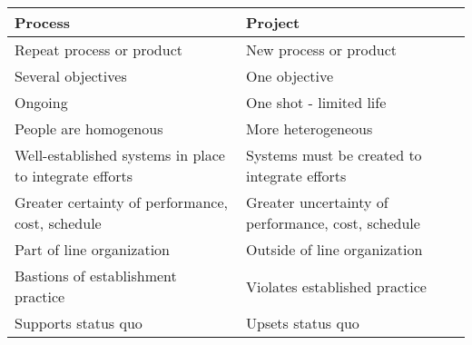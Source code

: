 \begin{itemize}
		\begin{table}[H]
			\centering
			\begin{tabular}{| l | l |}
				\hline
				Process & Project \\ \hline
				Repeat process or product & New process or product \\ \hline
				Several objectives & One objective \\ \hline
				Ongoing & One shot - limited life \\ \hline
				People are homogenous & More heterogeneous \\ \hline
				Well-established systems in place to integrate efforts & Systems must be
				created to integrate efforts \\ \hline
				Greater certainty of performance, cost, schedule & Greater uncertainty
				of performance, cost, schedule \\ \hline
				Part of line organization & Outside of line organization \\ \hline
				Bastions of establishment practice & Violates established practice \\ \hline
				Supports status quo & Upsets status quo \\ \hline
			\end{tabular}
		\end{table}
	\end{itemize}

\clearpage
